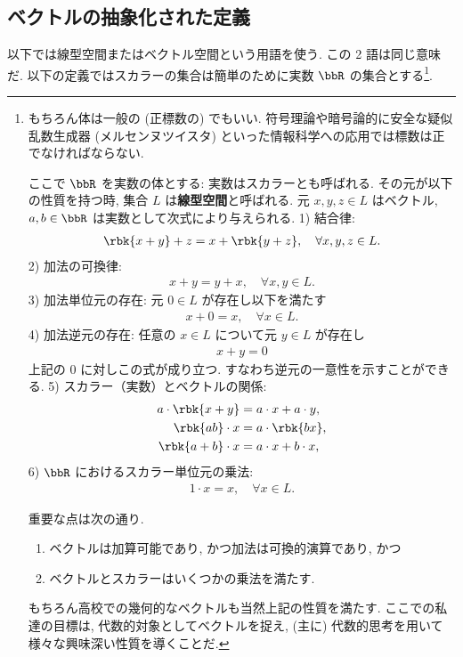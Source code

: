 \documentclass[openany, a4paper, oneside]{jsbook}
\begin{document}
\subsection{ベクトルの抽象化された定義}

以下では線型空間またはベクトル空間という用語を使う.
この 2 語は同じ意味だ.
以下の定義ではスカラーの集合は簡単のために実数 $\bbR$ の集合とする\footnote{もちろん体は一般の (正標数の) でもいい.
符号理論や暗号論的に安全な疑似乱数生成器 (メルセンヌツイスタ) といった情報科学への応用では標数は正でなければならない.

\begin{defn}[線型/ベクトル空間の定義]
ここで $\bbR$ を実数の体とする: 実数はスカラーとも呼ばれる.
その元が以下の性質を持つ時, 集合 $L$ は\textup{\textbf{線型空間}}と呼ばれる.
元 $x, y, z \in L$ はベクトル, $a, b \in \bbR$ は実数として次式により与えられる.
1) 結合律:
 \begin{align}
  \rbk{x + y} + z
  =
  x + \rbk{y + z}, \quad \forall x, y, z \in L.
 \end{align}
2) 加法の可換律:
 \begin{align}
  x + y = y + x,  \quad \forall x, y \in L.
 \end{align}
3) 加法単位元の存在: 元 $0 \in L$ が存在し以下を満たす
 \begin{align}
  x + 0 = x, \quad \forall x \in L.
 \end{align}
4) 加法逆元の存在: 任意の $x \in L$ について元 $y \in L$ が存在し
 \begin{align}
  x + y = 0
 \end{align}
   上記の $0$ に対しこの式が成り立つ.
   すなわち逆元の一意性を示すことができる.
5)  スカラー（実数）とベクトルの関係:
 \begin{align}
  a \cdot \rbk{x + y}
  &=
  a \cdot x + a \cdot y, \\
  \rbk{ab} \cdot x
  &=
  a \cdot \rbk{b x}, \\
  \rbk{a + b} \cdot x
  &=
  a \cdot x + b \cdot x,
 \end{align}
6) $\bbR$ におけるスカラー単位元の乗法:
 \begin{align}
  1 \cdot x = x, \quad \forall x \in L.
 \end{align}
\end{defn}
重要な点は次の通り.
\begin{enumerate}
\item ベクトルは加算可能であり, かつ加法は可換的演算であり, かつ
\item ベクトルとスカラーはいくつかの乗法を満たす.
\end{enumerate}

もちろん高校での幾何的なベクトルも当然上記の性質を満たす.
ここでの私達の目標は, 代数的対象としてベクトルを捉え,
(主に) 代数的思考を用いて様々な興味深い性質を導くことだ.}.
\end{document}
